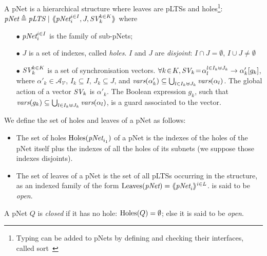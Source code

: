 \documentclass{llncs}
\newcommand{\cA}{\ensuremath{\mathcal{A}}}
\newcommand{\cV}{\ensuremath{\mathcal{V}}}
\newcommand{\variables}{\ensuremath{\cV}}
\newcommand{\actions}[1]{\ensuremath{\cA_{#1}}}
\begin{document}
\begin{definition}[pNets]\label{def-pnets}
A pNet is a hierarchical structure where leaves are pLTSs and holes\footnote{Typing can 
be added to pNets by defining and checking their interfaces, called 
sort~\cite{HMZ-FORTE2016}}:
$\pNet\triangleq \pLTS~|~\mylangle \pNet_i^{i\in I}, J, \symb{SV}_k^{k\in 
K}\myrangle$
where
\begin{itemize}
\item[$\bullet$] $\pNet_i^{i\in I}$ is the family of sub-pNets;

\item[$\bullet$] $J$ is a set of indexes, called \emph{holes}.
$I$ and $J$ are \emph{disjoint}: $I\!\cap\! J=\emptyset$,  $I\!\cup\! J\neq\emptyset$

\item[$\bullet$] $\symb{SV}_k^{k\in K}$ is a set of
  synchronisation vectors. %
$\forall k\!\in\! K,
  \symb{SV}_k\!=\SV{\!\alpha_{l}^{l\in I_k \uplus J_k}}{\alpha'_k}{g_k}$, where
  $\alpha'_k\in \actions{\variables}$, $I_k\subseteq I$, $J_k\subseteq J$, and 
  $\vars(\alpha'_k)\subseteq \bigcup_{l\in I_k\uplus 
  J_k}{\vars({\alpha_l})}$. The global action of a vector $\symb{SV}_k$ is
$\alpha'_k$. The Boolean expression $g_k $, such that $\vars(g_k)\subseteq \bigcup_{l\in 
I_k\uplus J_k}{\vars({\alpha_l})}$, is a guard associated to the vector.


\end{itemize}
We define the set of holes and leaves of a pNet as follows:
  \begin{itemize}
\item
The set of holes $\Holes(\pNet_{i_1})$ of a pNet is the indexes of the holes of the pNet 
itself plus the indexes of all the holes of its subnets (we suppose those indexes 
disjoints).
%
\item
The set of leaves of a pNet is the set of all pLTSs occurring in the structure, as an 
indexed family of the form $\Leaves(\pNet)= \mylangle \pNet_i \myrangle^{i \in L}$.
is said to be \emph{open}.
\end{itemize}
A pNet $Q$ is \emph{closed} if it has no hole: $\operatorname{Holes}(Q)=\emptyset$; else it
is said to be \emph{open}.
\end{definition}
\end{document}
